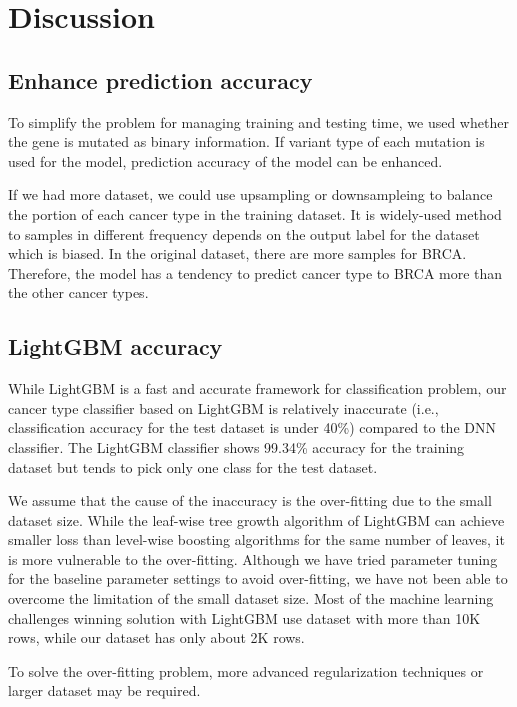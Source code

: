 \section{Discussion}

\subsection{Enhance prediction accuracy}

To simplify the problem for managing training and testing time, we used whether the gene is mutated as binary information. If variant type of each mutation is used for the model, prediction accuracy of the model can be enhanced.

If we had more dataset, we could use upsampling or downsampleing to balance the portion of each cancer type in the training dataset. It is widely-used method to samples in different frequency depends on the output label for the dataset which is biased. In the original dataset, there are more samples for BRCA. Therefore, the model has a tendency to predict cancer type to BRCA more than the other cancer types.

\subsection{LightGBM accuracy}

While LightGBM is a fast and accurate framework for classification problem, our cancer type classifier based on LightGBM is relatively inaccurate (i.e., classification accuracy for the test dataset is under  40\%) compared to the DNN classifier. The LightGBM classifier shows 99.34\% accuracy for the training dataset but tends to pick only one class for the test dataset. 

We assume that the cause of the inaccuracy is the over-fitting due to the small dataset size. While the leaf-wise tree growth algorithm of LightGBM can achieve smaller loss than level-wise boosting algorithms for the same number of leaves, it is more vulnerable to the over-fitting. Although we have tried parameter tuning for the baseline parameter settings to avoid over-fitting, we have not been able to overcome the limitation of the small dataset size. Most of the machine learning challenges winning solution with LightGBM use dataset with more than 10K rows, while our dataset has only about 2K rows.

To solve the over-fitting problem, more advanced regularization techniques or larger dataset may be required.
